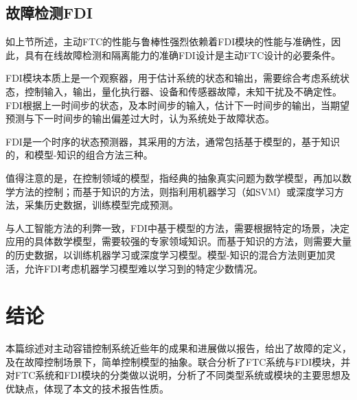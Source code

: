 \documentclass[UTF8]{article}
\begin{document}
\subsection{故障检测FDI}
如上节所述，主动FTC的性能与鲁棒性强烈依赖着FDI模块的性能与准确性，因此，具有在线故障检测和隔离能⼒的准确FDI设计是主动FTC设计的必要条件。

FDI模块本质上是一个观察器，用于估计系统的状态和输出，需要综合考虑系统状态，控制输入，输出，量化执行器、设备和传感器故障，未知干扰及不确定性。
FDI根据上一时间步的状态，及本时间步的输入，估计下一时间步的输出，当期望预测与下一时间步的输出偏差过大时，认为系统处于故障状态。

FDI是一个时序的状态预测器，其采用的方法，通常包括基于模型的\cite{DonaldLSimon2013AircraftEG}，基于知识的\cite{AchmadWidodo2007SupportVM}，和模型-知识的组合方法\cite{HeidarAliTalebi2009ARN}三种。

值得注意的是，在控制领域的模型，指经典的抽象真实问题为数学模型，再加以数学方法的控制；而基于知识的方法，则指利用机器学习（如SVM）或深度学习方法，采集历史数据，训练模型完成预测。

与人工智能方法的利弊一致，FDI中基于模型的方法，需要根据特定的场景，决定应用的具体数学模型，需要较强的专家领域知识。而基于知识的方法，则需要大量的历史数据，以训练机器学习或深度学习模型。模型-知识的混合方法则更加灵活，允许FDI考虑机器学习模型难以学习到的特定少数情况。
\section{结论}
本篇综述对主动容错控制系统近些年的成果和进展做以报告，给出了故障的定义，及在故障控制场景下，简单控制模型的抽象。联合分析了FTC系统与FDI模块，并对FTC系统和FDI模块的分类做以说明，分析了不同类型系统或模块的主要思想及优缺点，体现了本文的技术报告性质。


\end{document}
